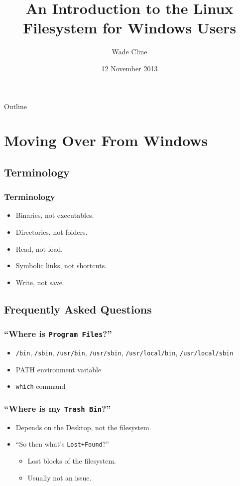 \documentclass[xcolor={dvipsnames,svgnames},hyperref=dvips]{beamer}
\title[Linux Filesystems Introduction]{An Introduction to the Linux Filesystem for Windows Users}
\author{Wade Cline}
\date{12 November 2013}
\begin{document}
\begin{frame}
  \titlepage
\end{frame}

\begin{frame}{Outline}
  \tableofcontents
\end{frame}

\section{Moving Over From Windows}\label{section:windowsux}
	\subsection{Terminology}
	\begin{frame}
		\frametitle{Terminology}
		\begin{itemize}
		\item Binaries, not executables.
		\item Directories, not folders.
		\item Read, not load.
		\item Symbolic links, not shortcuts.
		\item Write, not save.
		\end{itemize}
	\end{frame}

	\subsection{Frequently Asked Questions}
	\begin{frame}
		\frametitle{``Where is \texttt{Program Files}?''}
		\begin{itemize}
		\item \texttt{/bin}, \texttt{/sbin}, \texttt{/usr/bin}, \texttt{/usr/sbin}, \texttt{/usr/local/bin}, \texttt{/usr/local/sbin}
		\item PATH environment variable
		\item \texttt{which} command
		\end{itemize}
	\end{frame}

	\begin{frame}
		\frametitle{``Where is my \texttt{Trash Bin}?''}
		\begin{itemize}
		\item Depends on the Desktop, not the filesystem.
		\item ``So then what's \texttt{Lost+Found}?''
			\begin{itemize}
			\item Lost blocks of the filesystem.
			\item Usually not an issue.
			\end{itemize}
		\end{itemize}
	\end{frame}
\end{document}
